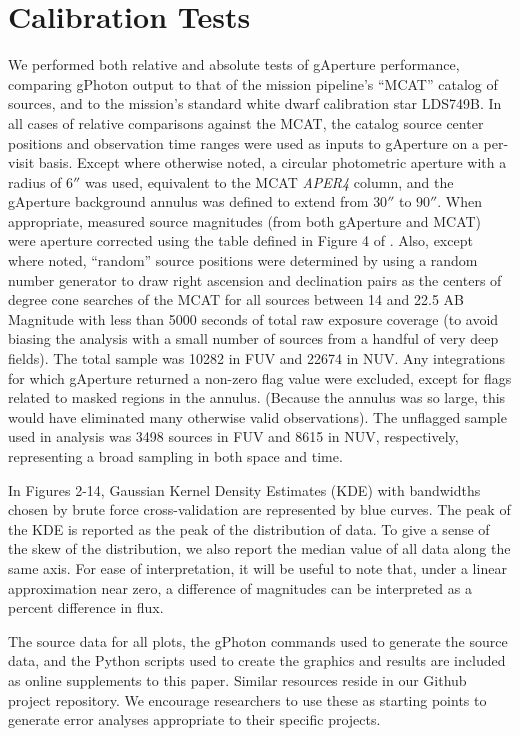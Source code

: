 \documentclass[preprint]{aastex}
\begin{document}
\section{Calibration Tests}
\label{calibration}
We performed both relative and absolute tests of gAperture performance, comparing gPhoton output to that of the mission pipeline's ``MCAT'' catalog of sources, and to the mission's standard white dwarf calibration star LDS749B. In all cases of relative comparisons against the MCAT, the catalog source center positions and observation time ranges were used as inputs to gAperture on a per-visit basis. Except where otherwise noted, a circular photometric aperture with a radius of $6''$ was used, equivalent to the MCAT \emph{APER4} column, and the gAperture background annulus was defined to extend from $30''$ to $90''$. When appropriate, measured source magnitudes (from both gAperture and MCAT) were aperture corrected using the table defined in Figure 4 of \cite{mor2007}. Also, except where noted, ``random'' source positions were determined by using a random number generator to draw right ascension and declination pairs as the centers of  degree cone searches of the MCAT for all sources between 14 and 22.5 AB Magnitude with less than 5000 seconds of total raw exposure coverage (to avoid biasing the analysis with a small number of sources from a handful of very deep fields). The total sample was 10282 in FUV and 22674 in NUV. Any integrations for which gAperture returned a non-zero flag value were excluded, except for flags related to masked regions in the annulus. (Because the annulus was so large, this would have eliminated many otherwise valid observations). The unflagged sample used in analysis was 3498 sources in FUV and 8615 in NUV, respectively, representing a broad sampling in both space and time.

In Figures 2-14, Gaussian Kernel Density Estimates (KDE) with bandwidths chosen by brute force cross-validation are represented by blue curves. The peak of the KDE is reported as the peak of the distribution of data. To give a sense of the skew of the distribution, we also report the median value of all data along the same axis. For ease of interpretation, it will be useful to note that, under a linear approximation near zero, a difference of magnitudes can be interpreted as a percent difference in flux.

The source data for all plots, the gPhoton commands used to generate the source data, and the Python scripts used to create the graphics and results are included as online supplements to this paper. Similar resources reside in our Github project repository. We encourage researchers to use these as starting points to generate error analyses appropriate to their specific projects.
\end{document}
